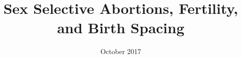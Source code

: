 \documentclass[12pt,letterpaper]{article}
\title{Sex Selective Abortions, Fertility, and Birth Spacing
}
\author{}
\date{October 2017}
\begin{document}
\graphicspath{{../figures/}}
\doublespacing

\appendix


\renewcommand\thefigure{\thesection.\arabic{figure}}    

\renewcommand\thetable{\thesection.\arabic{table}}    
\setcounter{table}{0}


% 
% 
\end{document}
